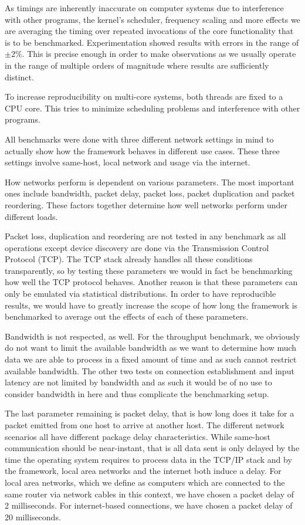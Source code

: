 As timings are inherently inaccurate on computer systems due to interference with other programs, the kernel's scheduler, frequency scaling and more effects we are averaging the timing over repeated invocations of the core functionality that is to be benchmarked.
Experimentation showed results with errors in the range of $\pm2\%$.
This is precise enough in order to make observations as we usually operate in the range of multiple orders of magnitude where results are sufficiently distinct.

To increase reproducibility on multi-core systems, both threads are fixed to a CPU core.
This tries to minimize scheduling problems and interference with other programs.

\medskip

All benchmarks were done with three different network settings in mind to actually show how the framework behaves in different use cases.
These three settings involve same-host, local network and usage via the internet.

How networks perform is dependent on various parameters.
The most important ones include bandwidth, packet delay, packet loss, packet duplication and packet reordering.
These factors together determine how well networks perform under different loads.

Packet loss, duplication and reordering are not tested in any benchmark as all operations except device discovery are done via the Transmission Control Protocol (TCP).
The TCP stack already handles all these conditions transparently, so by testing these parameters we would in fact be benchmarking how well the TCP protocol behaves.
Another reason is that these parameters can only be emulated via statistical distributions.
In order to have reproducible results, we would have to greatly increase the scope of how long the framework is benchmarked to average out the effects of each of these parameters.

Bandwidth is not respected, as well.
For the throughput benchmark, we obviously do not want to limit the available bandwidth as we want to determine how much data we are able to process in a fixed amount of time and as such cannot restrict available bandwidth.
The other two tests on connection establishment and input latency are not limited by bandwidth and as such it would be of no use to consider bandwidth in here and thus complicate the benchmarking setup.

The last parameter remaining is packet delay, that is how long does it take for a packet emitted from one host to arrive at another host.
The different network scenarios all have different package delay characteristics.
While same-host communication should be near-instant, that is all data sent is only delayed by the time the operating system requires to process data in the TCP/IP stack and by the framework, local area networks and the internet both induce a delay.
For local area networks, which we define as computers which are connected to the same router via network cables in this context, we have chosen a packet delay of 2 milliseconds.
For internet-based connections, we have chosen a packet delay of 20 milliseconds.

